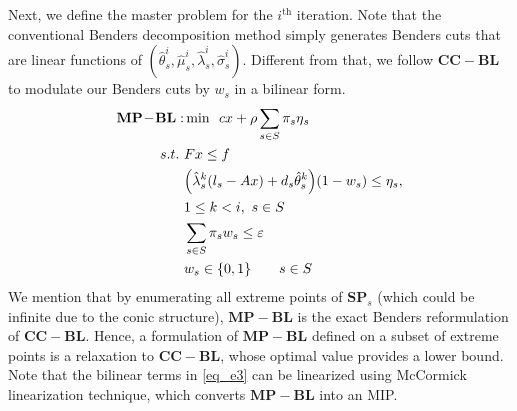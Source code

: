 \documentclass[journal]{IEEEtran}
\theoremstyle{remark}
\begin{document}
Next, we define the master problem for the $i^\textrm{th}$ iteration. Note that the conventional Benders decomposition method simply generates Benders cuts that are linear functions of $(\hat \theta^{i}_s, \hat \mu^i_s, \hat \lambda^i_s, \hat \sigma^i_s)$. Different from that, we follow  $\mathbf{CC-BL}$ to modulate our Benders cuts by $w_s$ in a bilinear form.
\begin{subequations}
\begin{align}
{\bf{MP\!-\!BL}}: & \min \,\,\,cx + \rho \sum_{s\in S} \pi_s\eta{_s} \label{eq_e1} \\
s.t. \,\,      & Fx \le f                       \label{eq_e2}\\
  & \Big(\hat \lambda^k_{s}(l_{s}-Ax)+d_{s}\hat \theta^k_{s} \Big)(1-w_{s}) \leq \eta_{s}, \nonumber\\
 & 1\leq k<i, \ s\in S  \label{eq_e3}\\
    & \sum_{s \in S} {\pi _s}{w_s} \leq \varepsilon   \label{eq_e4} \\
  & w_s \in \{ 0,1\}  \qquad    s\in S\label{eq_e5}
\end{align}
\end{subequations}
We mention that by enumerating all extreme points of $\mathbf{SP}_s$ (which could be infinite due to the conic structure), $\mathbf{MP-BL}$ is the exact Benders reformulation of $\mathbf{CC-BL}$. Hence, a formulation of $\mathbf{MP-BL}$ defined on a subset of extreme points is a relaxation to $\mathbf{CC-BL}$, whose optimal value provides a lower bound. Note that the bilinear terms in  \eqref{eq_e3} can be linearized using McCormick linearization technique, which converts $\mathbf{MP-BL}$ into an MIP.
\end{document}
